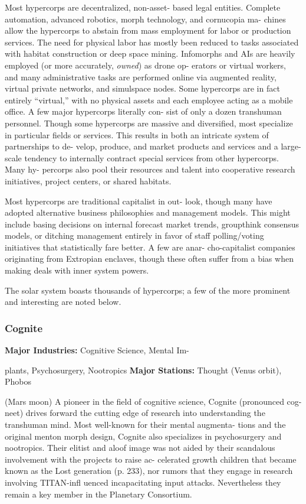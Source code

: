Most hypercorps are decentralized, non-asset-
based legal entities. Complete automation, advanced 
robotics, morph technology, and cornucopia ma-
chines allow the hypercorps to abstain from mass 
employment for labor or production services. The 
need for physical labor has mostly been reduced 
to tasks associated with habitat construction or 
deep space mining. Infomorphs and AIs are heavily 
employed (or more accurately, \textit{owned}) as drone op-
erators or virtual workers, and many administrative 
tasks are performed online via augmented reality, 
virtual private networks, and simulspace nodes. 
Some hypercorps are in fact entirely ``virtual,'' with 
no physical assets and each employee acting as a 
mobile office. A few major hypercorps literally con-
sist of only a dozen transhuman personnel. Though 
some hypercorps are massive and diversified, most 
specialize in particular fields or services. This results 
in both an intricate system of partnerships to de-
velop, produce, and market products and services 
and a large-scale tendency to internally contract 
special services from other hypercorps. Many hy-
percorps also pool their resources and talent into 
cooperative research initiatives, project centers, or 
shared habitats.

Most hypercorps are traditional capitalist in out-
look, though many have adopted alternative business 
philosophies and management models. This might 
include basing decisions on internal forecast market 
trends, groupthink consensus models, or ditching 
management entirely in favor of staff polling/voting 
initiatives that statistically fare better. A few are anar-
cho-capitalist companies originating from Extropian 
enclaves, though these often suffer from a bias when 
making deals with inner system powers.

The solar system boasts thousands of hypercorps; 
a few of the more prominent and interesting are 
noted below.

\subsubsection{Cognite}

\textbf{Major Industries:} Cognitive Science, Mental Im-

plants, Psychosurgery, Nootropics
\textbf{Major Stations:} Thought (Venus orbit), Phobos 

(Mars moon)
A pioneer in the field of cognitive science, Cognite 
(pronounced cog-neet) drives forward the cutting 
edge of research into understanding the transhuman 
mind. Most well-known for their mental augmenta-
tions and the original menton morph design, Cognite 
also specializes in psychosurgery and nootropics. 
Their elitist and aloof image was not aided by their 
scandalous involvement with the projects to raise ac-
celerated growth children that became known as the 
Lost generation (p. 233), nor rumors that they engage 
in research involving TITAN-infl uenced incapacitating 
input attacks. Nevertheless they remain a key member 
in the Planetary Consortium.

